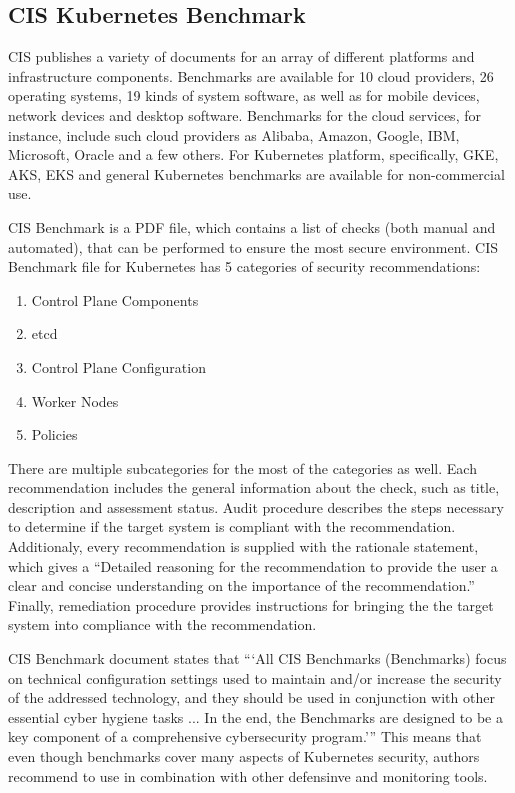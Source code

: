 \subsection{CIS Kubernetes Benchmark}
\label{sss:cis-kubernetes-benchmark}

CIS publishes a variety of documents for an array of different platforms and infrastructure components. Benchmarks are available for 10 cloud providers, 26 operating systems, 19 kinds of system software, as well as for mobile devices, network devices and desktop software. Benchmarks for the cloud services, for instance, include such cloud providers as Alibaba, Amazon, Google, IBM, Microsoft, Oracle and a few others. For Kubernetes platform, specifically, GKE, AKS, EKS and general Kubernetes benchmarks are available for non-commercial use. 

CIS Benchmark is a PDF file, which contains a list of checks (both manual and automated), that can be performed to ensure the most secure environment. CIS Benchmark file for Kubernetes has 5 categories of security recommendations:
\begin{enumerate}[noitemsep]
    \item Control Plane Components
    \item etcd
    \item Control Plane Configuration
    \item Worker Nodes
    \item Policies
\end{enumerate}

There are multiple subcategories for the most of the categories as well. Each recommendation includes the general information about the check, such as title, description and assessment status. Audit procedure describes the steps necessary to determine if the target system is compliant with the recommendation. Additionaly, every recommendation is supplied with the rationale statement, which gives a ``Detailed reasoning for the recommendation to provide the user a clear and concise understanding on the importance of the recommendation.'' Finally, remediation procedure provides instructions for bringing the the target system into compliance with the recommendation.

CIS Benchmark document \cite{cis-kubernetes-benchmark} states that ```All CIS Benchmarks (Benchmarks) focus on technical configuration settings used to maintain and/or increase the security of the addressed technology, and they should be used in conjunction with other essential cyber hygiene tasks ... In the end, the Benchmarks are designed to be a key component of a comprehensive cybersecurity program.''' This means that even though benchmarks cover many aspects of Kubernetes security, authors recommend to use in combination with other defensinve and monitoring tools.

